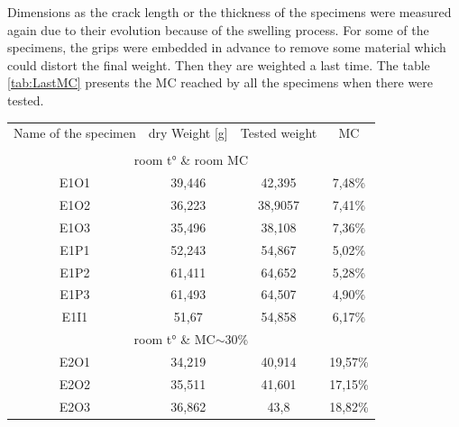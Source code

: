 Dimensions as the crack length or the thickness of the specimens were measured again due to their evolution because of the swelling process. For some of the specimens, the grips were embedded in advance to remove some material which could distort the final weight. Then they are weighted a last time. The table \ref{tab:LastMC} presents the MC reached by all the specimens when there were tested.
\newpage
\begin{table}[th]
	\centering
	\begin{tabular}{cccc}
				
		\multicolumn{1}{c}{Name of   the specimen} & \multicolumn{1}{c}{dry Weight {[}g{]}} & \multicolumn{1}{c}{Tested weight} & \multicolumn{1}{c}{MC} \\ 
		\multicolumn{4}{c}{} \\ 
		\multicolumn{4}{c}{\cellcolor[HTML]{F4B084}room t° \& room MC} \\ 
		\multicolumn{1}{c}{E1O1} & \multicolumn{1}{c}{39,446} & \multicolumn{1}{c}{42,395} & \multicolumn{1}{c}{7,48\%} \\ 
		\multicolumn{1}{c}{E1O2} & \multicolumn{1}{c}{36,223} & \multicolumn{1}{c}{38,9057} & \multicolumn{1}{c}{7,41\%} \\ 
		\multicolumn{1}{c}{E1O3} & \multicolumn{1}{c}{35,496} & \multicolumn{1}{c}{38,108} & \multicolumn{1}{c}{7,36\%} \\ 
		\multicolumn{1}{c}{E1P1} & \multicolumn{1}{c}{52,243} & \multicolumn{1}{c}{54,867} & \multicolumn{1}{c}{5,02\%} \\ 
		\multicolumn{1}{c}{E1P2} & \multicolumn{1}{c}{61,411} & \multicolumn{1}{c}{64,652} & \multicolumn{1}{c}{5,28\%} \\ 
		\multicolumn{1}{c}{E1P3} & \multicolumn{1}{c}{61,493} & \multicolumn{1}{c}{64,507} & \multicolumn{1}{c}{4,90\%} \\ 
		\multicolumn{1}{c}{E1I1} & \multicolumn{1}{c}{51,67} & \multicolumn{1}{c}{54,858} & \multicolumn{1}{c}{6,17\%} \\ 
		\multicolumn{4}{c}{\cellcolor[HTML]{F4B084}room t° \& MC$\sim$30\%} \\ 
		\multicolumn{1}{c}{E2O1} & \multicolumn{1}{c}{34,219} & \multicolumn{1}{c}{40,914} & \multicolumn{1}{c}{19,57\%} \\ 
		\multicolumn{1}{c}{E2O2} & \multicolumn{1}{c}{35,511} & \multicolumn{1}{c}{41,601} & \multicolumn{1}{c}{17,15\%} \\ 
		\multicolumn{1}{c}{E2O3} & \multicolumn{1}{c}{36,862} & \multicolumn{1}{c}{43,8} & \multicolumn{1}{c}{18,82\%} \\ 

\end{tabular}
\end{table}
